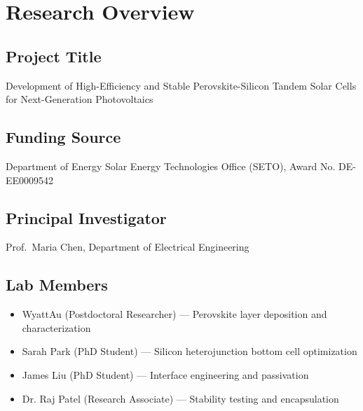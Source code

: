 \documentclass[
    language=english,
    doctype=research-notebook,
    institution=none,
]{../../omnilatex}
\begin{document}
\maketitle

\begin{abstract}
This research notebook documents the development and characterization of novel
perovskite-silicon tandem solar cells during the period January--June 2025.
The work focuses on optimizing the perovskite absorber layer composition,
interface engineering, and stability testing under accelerated aging conditions.
Key achievements include a certified power conversion efficiency of 29.8\% and
demonstration of $<$5\% relative efficiency loss after 1,000 hours of maximum
power point tracking under AM1.5G illumination.
\end{abstract}

\section{Research Overview}
\label{sec:overview}

\subsection{Project Title}
Development of High-Efficiency and Stable Perovskite-Silicon Tandem Solar Cells
for Next-Generation Photovoltaics

\subsection{Funding Source}
Department of Energy Solar Energy Technologies Office (SETO), Award No. DE-EE0009542

\subsection{Principal Investigator}
Prof.\ Maria Chen, Department of Electrical Engineering

\subsection{Lab Members}
\begin{itemize}
    \item WyattAu (Postdoctoral Researcher) --- Perovskite layer deposition and characterization
    \item Sarah Park (PhD Student) --- Silicon heterojunction bottom cell optimization
    \item James Liu (PhD Student) --- Interface engineering and passivation
    \item Dr. Raj Patel (Research Associate) --- Stability testing and encapsulation
\end{itemize}
\end{document}
